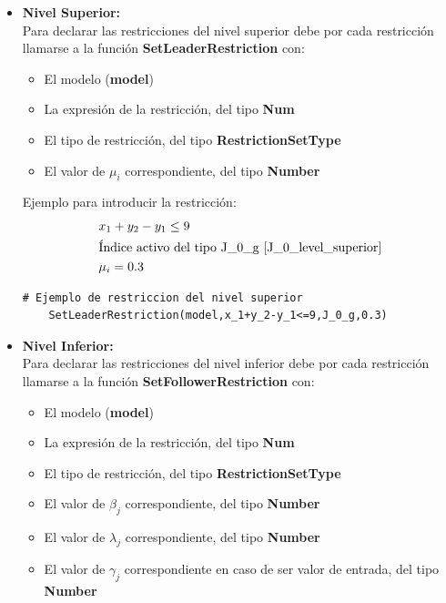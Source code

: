 \begin{itemize}
    \item \textbf{Nivel Superior:}\\

Para declarar las restricciones del nivel superior debe por cada restricción
llamarse a la función \textbf{SetLeaderRestriction} con:
\begin{itemize}
    \item El modelo (\textbf{model})
    \item La expresión de la restricción, del tipo \textbf{Num}
    \item El tipo de restricción, del tipo \textbf{RestrictionSetType}
    \item El valor de $\mu_i$ correspondiente, del tipo \textbf{Number} 
\end{itemize}

Ejemplo para introducir la restricción:
\begin{align*}
    &x_1+y_2-y_1 \leq 9 \\
    &\text{Índice activo del tipo J\_0\_g \ref{J_0_level_superior}}\\
    & \mu_i=0.3
\end{align*}

\begin{lstlisting}[caption={Introducir restricción del nivel superior}]
    # Ejemplo de restriccion del nivel superior
    SetLeaderRestriction(model,x_1+y_2-y_1<=9,J_0_g,0.3)
\end{lstlisting}


\item \textbf{Nivel Inferior:}\\
Para declarar las restricciones del nivel inferior debe por cada restricción
llamarse a la función \textbf{SetFollowerRestriction} con:
\begin{itemize}
   \item El modelo (\textbf{model})
   \item La expresión de la restricción, del tipo \textbf{Num}
   \item El tipo de restricción, del tipo \textbf{RestrictionSetType}
   \item El valor de $\beta_j$ correspondiente, del tipo \textbf{Number}
   \item El valor de $\lambda_j$ correspondiente, del tipo \textbf{Number}
   \item El valor de $\gamma_j$ correspondiente en caso de ser valor de entrada, del tipo \textbf{Number}
\end{itemize}



\end{itemize}
